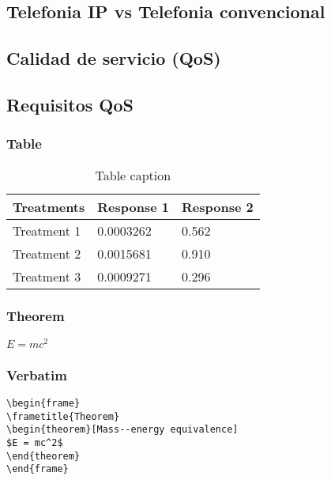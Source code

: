 \documentclass{beamer}
\begin{document}
\subsection{Telefonia IP vs Telefonia convencional}
\subsection{Calidad de servicio (QoS)}
\subsection{Requisitos QoS}

\begin{frame}
\frametitle{Table}
\begin{table}
\begin{tabular}{l l l}
\toprule
\textbf{Treatments} & \textbf{Response 1} & \textbf{Response 2}\\
\midrule
Treatment 1 & 0.0003262 & 0.562 \\
Treatment 2 & 0.0015681 & 0.910 \\
Treatment 3 & 0.0009271 & 0.296 \\
\bottomrule
\end{tabular}
\caption{Table caption}
\end{table}
\end{frame}


\begin{frame}
\frametitle{Theorem}
\begin{theorem}
$E = mc^2$
\end{theorem}
\end{frame}


\begin{frame}[fragile] %
\frametitle{Verbatim}
\begin{example}
\begin{verbatim}
\begin{frame}
\frametitle{Theorem}
\begin{theorem}[Mass--energy equivalence]
$E = mc^2$
\end{theorem}
\end{frame}\end{verbatim}
\end{example}
\end{frame}
\end{document}
